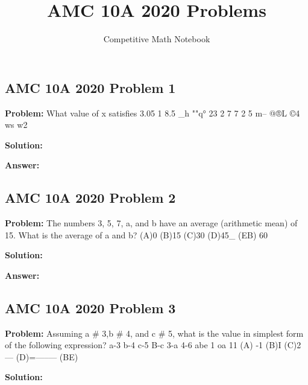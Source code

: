 \documentclass{article}
\title{AMC 10A 2020 Problems}
\author{Competitive Math Notebook}
\date{}
\newenvironment{problem}{\textbf{Problem: }}{\\}
\newenvironment{solution}{\textbf{Solution: }}{\\}
\newenvironment{answer}{\textbf{Answer: }}{\\}
\begin{document}
\maketitle

\subsection{AMC 10A 2020 Problem 1}

\begin{problem}
What value of x satisfies 3.05 1 8.5 _h ""q° 23 2 7 7 2 5 m-- @®L ©4 ws w2
\end{problem}

\begin{solution}
\end{solution}

\begin{answer}
\end{answer}

\subsection{AMC 10A 2020 Problem 2}

\begin{problem}
The numbers 3, 5, 7, a, and b have an average (arithmetic mean) of 15. What is the average of a and b? (A)0 (B)15 (C)30 (D)45_ (EB) 60
\end{problem}

\begin{solution}
\end{solution}

\begin{answer}
\end{answer}

\subsection{AMC 10A 2020 Problem 3}

\begin{problem}
Assuming a # 3,b # 4, and c # 5, what is the value in simplest form of the following expression? a-3 b-4 c-5 B-c 3-a 4-6 abe 1 oa 11 (A) -1 (B)I (C)2— (D)=—--— (BE)
\end{problem}

\begin{solution}
\end{solution}
\end{document}
